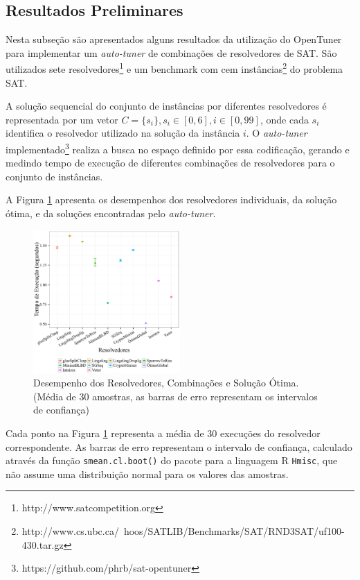 \documentclass[a4paper, 12pt]{article}
\begin{document}
\subsection{Resultados Preliminares}

Nesta subseção são apresentados alguns resultados da utilização do OpenTuner
para implementar um \emph{auto-tuner} de combinações de resolvedores de
SAT. São utilizados sete resolvedores\footnote{http://www.satcompetition.org}
e um benchmark com cem
instâncias\footnote{http://www.cs.ubc.ca/~hoos/SATLIB/Benchmarks/SAT/RND3SAT/uf100-430.tar.gz}
do problema SAT.

A solução sequencial do conjunto de instâncias por diferentes resolvedores é
representada por um vetor $C = \{s_i\}, s_i \in [0,6], i \in [0,99]$, onde
cada $s_i$ identifica o resolvedor utilizado na solução da instância $i$.
O \emph{auto-tuner}
implementado\footnote{https://github.com/phrb/sat-opentuner} realiza a busca no
espaço definido por essa codificação, gerando e medindo tempo de execução de
diferentes combinações de resolvedores para o conjunto de instâncias.

A Figura \ref{fig:cmp_brute_tuned} apresenta os desempenhos dos resolvedores
individuais, da solução ótima, e da soluções encontradas
pelo \emph{auto-tuner}.

\begin{figure}[H]
    \centering
    \includegraphics[width=0.5\textwidth]{brute_tuned.eps}
    \captionsetup{width=0.6\textwidth}
    \caption{Desempenho dos Resolvedores, Combinações e Solução Ótima.
             (Média de 30 amostras, as barras de erro representam
             os intervalos de confiança)}
    \label{fig:cmp_brute_tuned}
\end{figure}

Cada ponto na Figura \ref{fig:cmp_brute_tuned} representa a média de 30
execuções do resolvedor correspondente. As barras de erro representam
o intervalo de confiança, calculado através da função \texttt{smean.cl.boot()}
do pacote para a linguagem R \texttt{Hmisc}, que não assume uma distribuição
normal para os valores das amostras.
\end{document}
